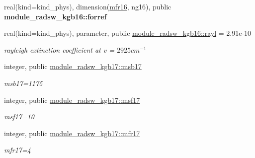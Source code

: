 \begin{DoxyCompactItemize}
\mbox{\label{group__module__radsw__kgbnn_ga8e8cf110f56c7d4253c63bbf607be34c}} 
real(kind=kind\+\_\+phys), dimension(\hyperlink{group__module__radsw__kgbnn_gaeee3fe8e44f6fbd9a6a008bc9f97f37c}{mfr16}, ng16), public {\bfseries module\+\_\+radsw\+\_\+kgb16\+::forref}
\item 
\mbox{\label{group__module__radsw__kgbnn_ga27964e0300eb686acf1ed3c8459d3810}} 
real(kind=kind\+\_\+phys), parameter, public \hyperlink{group__module__radsw__kgbnn_ga27964e0300eb686acf1ed3c8459d3810}{module\+\_\+radsw\+\_\+kgb16\+::rayl} = 2.\+91e-\/10
\begin{DoxyCompactList}\small\item\em rayleigh extinction coefficient at v = $2925 cm^{-1}$ \end{DoxyCompactList}\item 
\mbox{\label{group__module__radsw__kgbnn_gafbb056103147b8e5f4d5a8af40420ea0}} 
integer, public \hyperlink{group__module__radsw__kgbnn_gafbb056103147b8e5f4d5a8af40420ea0}{module\+\_\+radsw\+\_\+kgb17\+::msb17}
\begin{DoxyCompactList}\small\item\em msb17=1175 \end{DoxyCompactList}\item 
\mbox{\label{group__module__radsw__kgbnn_ga6864c3b95515fb2f408e21298da3952f}} 
integer, public \hyperlink{group__module__radsw__kgbnn_ga6864c3b95515fb2f408e21298da3952f}{module\+\_\+radsw\+\_\+kgb17\+::msf17}
\begin{DoxyCompactList}\small\item\em msf17=10 \end{DoxyCompactList}\item 
\mbox{\label{group__module__radsw__kgbnn_gadd099d7e1b5e7767d77de6d96673e26f}} 
integer, public \hyperlink{group__module__radsw__kgbnn_gadd099d7e1b5e7767d77de6d96673e26f}{module\+\_\+radsw\+\_\+kgb17\+::mfr17}
\begin{DoxyCompactList}\small\item\em mfr17=4 \end{DoxyCompactList}\item 
\mbox{\label{group__module__radsw__kgbnn_gaade34dfbe8c5f380088b6e03acc727c9}} 

\end{DoxyCompactItemize}
